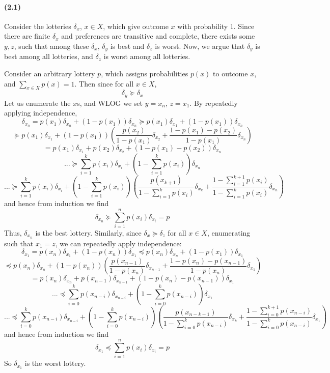 \documentclass[10pt,letter]{article}
\begin{document}
\paragraph{(2.1)}
Consider the lotteries $\delta_x$, $x \in X$, which give outcome $x$ with probability $1$. Since there are finite $\delta_x$ and preferences are transitive and complete, there exists some $y,z$, such that among these $\delta_x$, $\delta_y$ is best and $\delta_z$ is worst. Now, we argue that $\delta_y$ is best among all lotteries, and $\delta_z$ is worst among all lotteries.

Consider an arbitrary lottery $p$, which assigns probabilities $p(x)$ to outcome $x$, and $\sum_{x \in X} p(x) = 1$. Then since for all $x \in X$,
\[ \delta_y \succeq \delta_x \]
Let us enumerate the $x$s, and WLOG we set $y = x_n$, $z = x_1$. By repeatedly applying independence,
\[ \delta_{x_n} = p(x_1) \delta_{x_n} + (1-p(x_1))\delta_{x_n}  \succeq  p(x_1) \delta_{x_1} + (1-p(x_1))\delta_{x_n}  \]
\[ \succeq p(x_1) \delta_{x_1} + (1-p(x_1))\left( \frac{p(x_2)}{1-p(x_1)} \delta_{x_2} + \frac{1 - p(x_1) - p(x_2)}{1-p(x_1)}\delta_{x_n} \right)  \]
\[ = p(x_1) \delta_{x_1} + p(x_2) \delta_{x_2} +  (1 - p(x_1) - p(x_2))\delta_{x_n} \]
\[ ... \succeq \sum_{i=1}^k p(x_i)\delta_{x_i} + \left(1 - \sum_{i=1}^k p(x_i)\right) \delta_{x_n} \]
\[ ... \succeq \sum_{i=1}^k p(x_i)\delta_{x_i} + \left(1 - \sum_{i=1}^k p(x_i)\right) \left( \frac{p(x_{k+1})}{1 - \sum_{i=1}^k p(x_i)} \delta_{x_k} + \frac{1 - \sum_{i=1}^{k+1} p(x_i)}{1 - \sum_{i=1}^k p(x_i)} \delta_{x_n} \right) \]
and hence from induction we find
\[ \delta_{x_n} \succeq \sum_{i=1}^n p(x_i)\delta_{x_i} = p \]
Thus, $\delta_{x_n}$ is the best lottery. Similarly, since $\delta_x \succeq \delta_z$ for all $x \in X$, enumerating such that $x_1 = z$, we can repeatedly apply independence:
\[ \delta_{x_1} = p(x_n) \delta_{x_1} + (1-p(x_n))\delta_{x_1}  \preceq  p(x_n) \delta_{x_n} + (1-p(x_1))\delta_{x_1}  \]
\[ \preceq p(x_n) \delta_{x_n} + (1-p(x_n))\left( \frac{p(x_{n-1})}{1-p(x_n)} \delta_{x_{n-1}} + \frac{1 - p(x_n) - p(x_{n-1})}{1-p(x_n)}\delta_{x_1} \right)  \]
\[ = p(x_n) \delta_{x_n} + p(x_{n-1}) \delta_{x_{n-1}} +  (1 - p(x_n) - p(x_{n-1}))\delta_{x_1} \]
\[ ... \preceq \sum_{i=0}^k p(x_{n-i})\delta_{x_{n-i}} + \left(1 - \sum_{i=0}^k p(x_{n-i})\right) \delta_{x_1} \]
\[ ... \preceq \sum_{i=0}^k p(x_{n-i})\delta_{x_{n-i}} + \left(1 - \sum_{i=0}^k p(x_{n-i})\right) \left( \frac{p(x_{n-k-1})}{1 - \sum_{i=0}^k p(x_{n-i})} \delta_{x_k} + \frac{1 - \sum_{i=0}^{k+1} p(x_{n-i})}{1 - \sum_{i=0}^k p(x_{n-i})} \delta_{x_1} \right) \]
and hence from induction we find
\[ \delta_{x_1} \preceq \sum_{i=1}^n p(x_i)\delta_{x_i} = p \]
So $\delta_{x_1}$ is the worst lottery.
\end{document}
